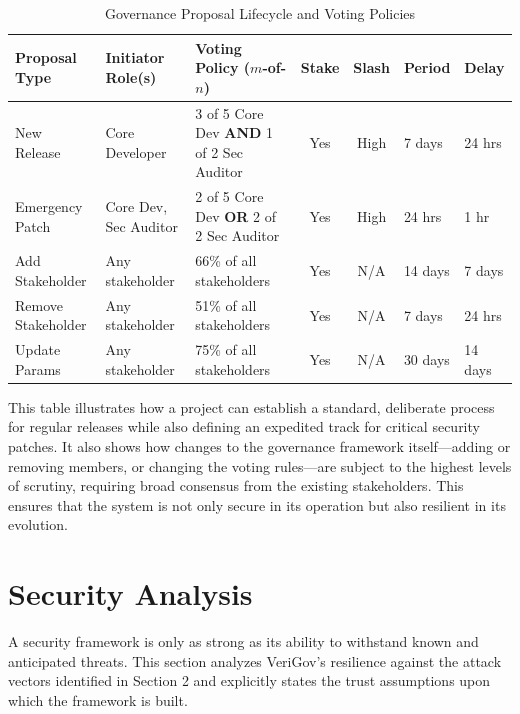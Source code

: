 \documentclass{article}
\begin{document}
\begin{table}[H]
    \centering
    \caption{Governance Proposal Lifecycle and Voting Policies}
    \label{tab:governance_policies}
    \footnotesize %
    \setlength{\tabcolsep}{3pt} %
    \begin{tabularx}{\textwidth}{l L L c c l l}
        \toprule
        \textbf{Proposal Type} & \textbf{Initiator Role(s)} & \textbf{Voting Policy ($m$-of-$n$)} & \textbf{Stake} & \textbf{Slash} & \textbf{Period} & \textbf{Delay} \\
        \midrule
        New Release & Core Developer & 3 of 5 Core Dev \textbf{AND} 1 of 2 Sec Auditor & Yes & High & 7 days & 24 hrs \\
        \addlinespace
        Emergency Patch & Core Dev, Sec Auditor & 2 of 5 Core Dev \textbf{OR} 2 of 2 Sec Auditor & Yes & High & 24 hrs & 1 hr \\
        \addlinespace
        Add Stakeholder & Any stakeholder & 66\% of all stakeholders & Yes & N/A & 14 days & 7 days \\
        \addlinespace
        Remove Stakeholder & Any stakeholder & 51\% of all stakeholders & Yes & N/A & 7 days & 24 hrs \\
        \addlinespace
        Update Params & Any stakeholder & 75\% of all stakeholders & Yes & N/A & 30 days & 14 days \\
        \bottomrule
    \end{tabularx}
\end{table}

This table illustrates how a project can establish a standard, deliberate process for regular releases while also defining an expedited track for critical security patches. It also shows how changes to the governance framework itself---adding or removing members, or changing the voting rules---are subject to the highest levels of scrutiny, requiring broad consensus from the existing stakeholders. This ensures that the system is not only secure in its operation but also resilient in its evolution.

\section{Security Analysis}
\label{sec:security-analysis}

A security framework is only as strong as its ability to withstand known and anticipated threats. This section analyzes VeriGov's resilience against the attack vectors identified in Section 2 and explicitly states the trust assumptions upon which the framework is built.
\end{document}
